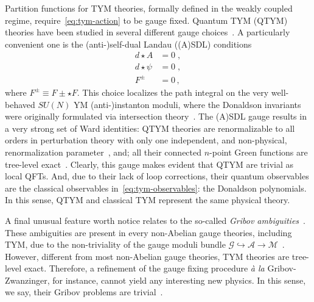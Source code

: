 \documentclass[../main.tex]{subfiles}
\begin{document}
Partition functions for TYM theories, formally defined in the weakly coupled regime, require~\eqref{eq:tym-action} to be gauge fixed. Quantum TYM (QTYM) theories have been studied in several different gauge choices~\cite{baulieu1988a,myers1990c,brandhuber1994a,piguet1995a,sadovski2017c,sadovski2018a,sadovski2018b}. A particularly convenient one is the (anti-)self-dual Landau ((A)SDL) conditions %
\begin{subequations}\label{eq:asdlg}
  \begin{align}
    d \star A    & = 0 \;, \\
    d \star \psi & = 0 \;, \\
    F^\pm        & = 0 \,,
  \end{align}
\end{subequations}
where $ F^\pm \equiv F \pm \star F $. This choice localizes the path integral on the very well-behaved $SU(N)$ YM (anti-)instanton moduli, where the Donaldson invariants were originally formulated via intersection theory~\cite{donaldson1983a,donaldson1990a,donaldson1990b}. The (A)SDL gauge results in a very strong set of Ward identities: QTYM theories are renormalizable to all orders in perturbation theory with only one independent, and non-physical, renormalization parameter~\cite{sadovski2017c}, and; all their connected $n$-point Green functions are tree-level exact~\cite{sadovski2018a}. Clearly, this gauge makes evident that QTYM are trivial as local QFTs. And, due to their lack of loop corrections, their quantum observables are the classical observables in~\eqref{eq:tym-observables}: the Donaldson polynomials. In this sense, QTYM and classical TYM represent the same physical theory. %

A final unusual feature worth notice relates to the so-called \textit{Gribov ambiguities}~\cite{gribov1978a}. These ambiguities are present in every non-Abelian gauge theories, including TYM, due to the non-triviality of the gauge moduli bundle $\mathcal{G} \hookrightarrow \mathcal{A} \rightarrow \mathcal{M}$~\cite{singer1978a}. However, different from most non-Abelian gauge theories, TYM theories are tree-level exact. Therefore, a refinement of the gauge fixing procedure \textit{\`a la} Gribov-Zwanzinger, for instance, cannot yield any interesting new physics. In this sense, we say, their Gribov problems are trivial~\cite{sadovski2020a}.
\end{document}

